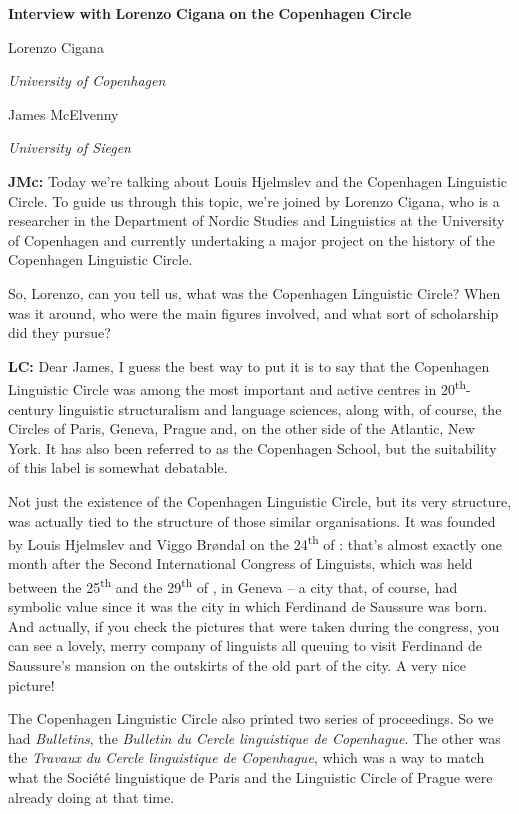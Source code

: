 

\textbf{Interview} \textbf{with} \textbf{Lorenzo} \textbf{Cigana} \textbf{on} \textbf{the} \textbf{Copenhagen} \textbf{Circle}

Lorenzo Cigana

\textit{University of Copenhagen}

James McElvenny

\textit{University of Siegen}

\textbf{JMc:} Today we’re talking about Louis Hjelmslev and the Copenhagen Linguistic Circle. To guide us through this topic, we’re joined by Lorenzo Cigana, who is a researcher in the Department of Nordic Studies and Linguistics at the University of Copenhagen and currently undertaking a major project on the history of the Copenhagen Linguistic Circle.

So, Lorenzo, can you tell us, what was the Copenhagen Linguistic Circle? When was it around, who were the main figures involved, and what sort of scholarship did they pursue?

\textbf{LC:} Dear James, I guess the best way to put it is to say that the Copenhagen Linguistic Circle was among the most important and active centres in 20\textsuperscript{th}{}-century linguistic structuralism and language sciences, along with, of course, the Circles of Paris, Geneva, Prague and, on the other side of the Atlantic, New York. It has also been referred to as the Copenhagen School, but the suitability of this label is somewhat debatable.

Not just the existence of the Copenhagen Linguistic Circle, but its very structure, was actually tied to the structure of those similar organisations. It was founded by Louis Hjelmslev and Viggo Brøndal on the 24\textsuperscript{th} of \citealt{September1931}: that’s almost exactly one month after the Second International Congress of Linguists, which was held between the 25\textsuperscript{th} and the 29\textsuperscript{th} of \citealt{August1931}, in Geneva – a city that, of course, had symbolic value since it was the city in which Ferdinand de Saussure was born. And actually, if you check the pictures that were taken during the congress, you can see a lovely, merry company of linguists all queuing to visit Ferdinand de Saussure’s mansion on the outskirts of the old part of the city. A very nice picture!

The Copenhagen Linguistic Circle also printed two series of proceedings. So we had \textit{Bulletins}, the \textit{Bulletin du Cercle linguistique de Copenhague}. The other was the \textit{Travaux} \textit{du Cercle linguistique de Copenhague}, which was a way to match what the Société linguistique de Paris and the Linguistic Circle of Prague were already doing at that time. 

